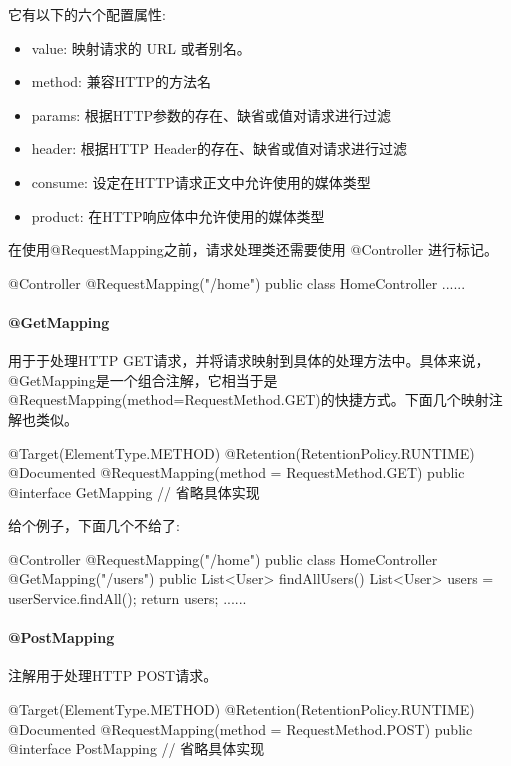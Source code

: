 它有以下的六个配置属性:
\begin{itemize}
    \item value: 映射请求的 URL 或者别名。
    \item method: 兼容HTTP的方法名
    \item params: 根据HTTP参数的存在、缺省或值对请求进行过滤
    \item header: 根据HTTP Header的存在、缺省或值对请求进行过滤
    \item consume: 设定在HTTP请求正文中允许使用的媒体类型
    \item product: 在HTTP响应体中允许使用的媒体类型
\end{itemize}

在使用@RequestMapping之前，请求处理类还需要使用 @Controller 进行标记。

\begin{Java}
@Controller
@RequestMapping("/home")
public class HomeController {
    ......
}
\end{Java}

\paragraph*{@GetMapping}

用于于处理HTTP GET请求，并将请求映射到具体的处理方法中。具体来说，@GetMapping是一个组合注解，它相当于是@RequestMapping(method=RequestMethod.GET)的快捷方式。下面几个映射注解也类似。

\begin{Java}
@Target(ElementType.METHOD)
@Retention(RetentionPolicy.RUNTIME)
@Documented
@RequestMapping(method = RequestMethod.GET)
public @interface GetMapping {
    // 省略具体实现
}
\end{Java}

给个例子，下面几个不给了:

\begin{Java}
@Controller
@RequestMapping("/home")
public class HomeController {
    @GetMapping("/users")
    public List<User> findAllUsers() {
        List<User> users = userService.findAll();
        return users;
    }
    ......
}
\end{Java}

\paragraph*{@PostMapping}

注解用于处理HTTP POST请求。

\begin{Java}
@Target(ElementType.METHOD)
@Retention(RetentionPolicy.RUNTIME)
@Documented
@RequestMapping(method = RequestMethod.POST)
public @interface PostMapping {
    // 省略具体实现
}
\end{Java}

